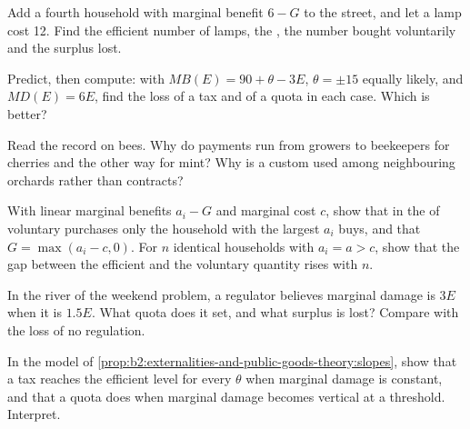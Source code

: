 \begin{exercise}[$\star\star$]\label{exo:b2:externalities-and-public-goods-theory:7}
Add a fourth household with marginal benefit $6 - G$ to the street, and let a lamp cost 12. Find the efficient number of lamps,
the , the number bought voluntarily and the surplus lost.
\end{exercise}

\begin{exercise}[$\star\star$]\label{exo:b2:externalities-and-public-goods-theory:8}
Predict, then compute: with $\mathit{MB}(E) = 90 + \theta - 3E$, $\theta = \pm 15$ equally likely, and $\mathit{MD}(E) = 6E$, find the loss of a tax and of a quota in each case.
Which is better?
\end{exercise}

\begin{exercise}[$\star\star$]\label{exo:b2:externalities-and-public-goods-theory:9}
Read the record on bees. Why do payments run from growers to beekeepers for cherries and the other way for mint? Why is a
custom used among neighbouring orchards rather than contracts?
\end{exercise}

\begin{exercise}[$\star\star\star$]\label{exo:b2:externalities-and-public-goods-theory:10}
With linear marginal benefits $a_i - G$ and marginal cost $c$, show that in the  of voluntary purchases only the
household with the largest $a_i$ buys, and that $G = \max(a_i - c, 0)$. For $n$ identical households with $a_i = a > c$, show that the gap between the
efficient and the voluntary quantity rises with $n$.
\end{exercise}

\begin{exercise}[$\star\star\star$]\label{exo:b2:externalities-and-public-goods-theory:11}
In the river of the weekend problem, a regulator believes marginal damage is $3E$ when it is $1.5E$. What quota does it set, and
what surplus is lost? Compare with the loss of no regulation.
\end{exercise}

\begin{exercise}[$\star\star\star$]\label{exo:b2:externalities-and-public-goods-theory:12}
In the model of \cref{prop:b2:externalities-and-public-goods-theory:slopes}, show that a tax reaches the efficient level for every $\theta$
when marginal damage is constant, and that a quota does when marginal damage becomes vertical at a threshold. Interpret.
\end{exercise}

